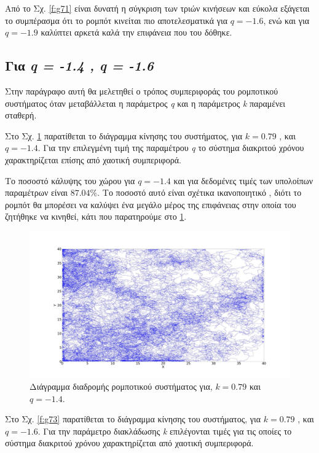 Από το Σχ. \ref{f:g71} είναι δυνατή η σύγκριση των τριών κινήσεων και εύκολα εξάγεται το
συμπέρασμα ότι το ρομπότ κινείται πιο αποτελεσματικά για $q = -1.6$, ενώ και για $q = -1.9$ καλύπτει αρκετά καλά την επιφάνεια που του δόθηκε.


\clearpage

\subsection{Για \emph{q = -1.4 , q = -1.6}}
\label{par:g1}
Στην παράγραφο αυτή θα μελετηθεί ο τρόπος συμπεριφοράς του ρομποτικού συστήματος όταν μεταβάλλεται η παράμετρος \emph{q} και η παράμετρος \emph{k} παραμένει σταθερή.

Στο Σχ. \ref{f:g72} παρατίθεται το διάγραμμα κίνησης του συστήματος, για $k=0.79$ , και $q = -1.4$. Για την επιλεγμένη τιμή της παραμέτρου \emph{q} το σύστημα διακριτού χρόνου χαρακτηρίζεται επίσης από χαοτική συμπεριφορά.

Το ποσοστό κάλυψης του χώρου για $q = -1.4$ και για δεδομένες τιμές των υπολοίπων παραμέτρων είναι $87.04 \%$. Το ποσοστό αυτό είναι σχέτικα ικανοποιητικό , διότι το ρομπότ θα μπορέσει να καλύψει ένα μεγάλο μέρος της επιφάνειας στην οποία του ζητήθηκε να κινηθεί, κάτι που παρατηρούμε στο \ref{f:g72}.


\begin{figure}[ht]
	\centering
	\includegraphics[width=1\linewidth]{LateX images/log/q/g3-1.4}
	\caption{Διάγραμμα διαδρομής ρομποτικού συστήματος για, $k = 0.79$ και $q = -1.4$.}
	\label{f:g72}	
\end{figure}

Στο Σχ. \ref{f:g73} παρατίθεται το διάγραμμα κίνησης του συστήματος, για $k=0.79$ , και $q = -1.6$. Για την παράμετρο διακλάδωσης \emph{k} επιλέγονται τιμές για τις οποίες το σύστημα διακριτού χρόνου χαρακτηρίζεται από χαοτική συμπεριφορά.

